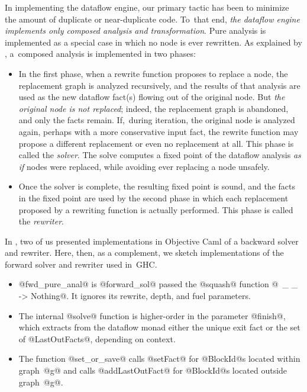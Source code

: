 \documentclass[blockstyle,preprint,nocopyrightspace]{sigplanconf}
\let\citeyear=\citeyearpar
\begin{document}
In implementing the dataflow engine, our primary tactic has been to
minimize the amount of duplicate or near-duplicate code.
To~that end, \emph{the dataflow engine implements only composed
analysis and transformation}.
Pure analysis is implemented as a special case in which no node is
ever rewritten.
As explained by \citet{lerner-grove-chambers:2002}, a~composed
analysis is implemented in two phases:
\begin{itemize}
\item
In the first phase, when a rewrite function proposes to replace a
node, the replacement graph is analyzed recursively, and the results
of that analysis are used as the new dataflow
fact(s) flowing out of the original node.
But \emph{the original node is not replaced}; indeed, the replacement
graph is abandoned, and only the facts remain.
If,~during iteration, the original node is analyzed again, perhaps
with a more conservative input fact, the rewrite function may propose
a different replacement or even no replacement at all.
This phase is called the \emph{solver}.
The solve computes a fixed point of the dataflow analysis
\emph{as if} nodes were replaced, while avoiding ever replacing a node
unsafely.
\item
Once the solver is complete, the resulting fixed point is sound,
and the facts in the fixed point are used by the second phase in which
each replacement proposed by a rewriting function is actually
performed.
This phase is called the \emph{rewriter}.
\end{itemize}

In \citeyear{ramsey-dias:applicative-flow-graph}, two of us
\citeauthor{ramsey-dias:applicative-flow-graph} presented
implementations in Objective Caml of a backward solver and rewriter.
Here, then, as a complement, we sketch implementations of the forward
solver and rewriter used in~GHC.


\begin{itemize}
\item
@fwd_pure_anal@ is @forward_sol@ passed the @squash@ function
@\ _ _ -> Nothing@.
It ignores its rewrite, depth, and fuel parameters.
\item
The internal @solve@ function is higher-order in the parameter
@finish@, which extracts from the dataflow monad either the unique
exit fact or the set of @LastOutFacts@, depending on context.
\item
The function @set_or_save@ calls @setFact@ for @BlockId@s located
within graph~@g@ and calls @addLastOutFact@ for @BlockId@s located
outside graph~@g@.
\end{itemize}
\end{document}
